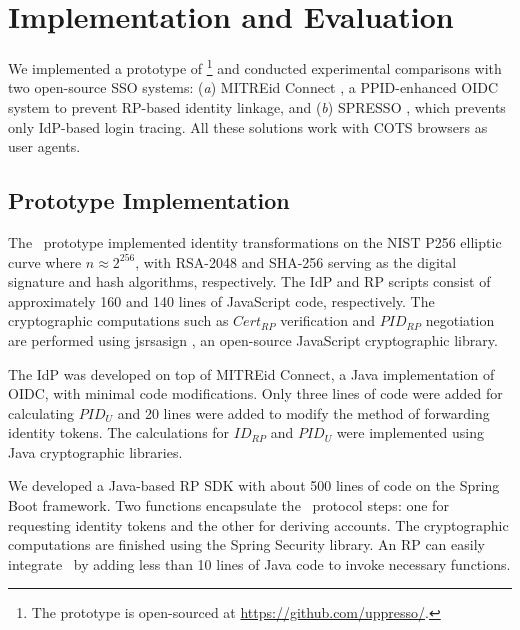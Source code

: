 \section{Implementation and Evaluation}
\label{sec:implementation}

We implemented a prototype of \usso\footnote{The prototype is open-sourced at \url{https://github.com/uppresso/}.} and conducted experimental comparisons with two open-source SSO systems:
 (\emph{a}) MITREid Connect \cite{MITREid}, a PPID-enhanced OIDC system \cite{NIST2017draft} to prevent RP-based identity linkage,
 and (\emph{b}) SPRESSO \cite{SPRESSO}, which prevents only IdP-based login tracing.
All these solutions work with COTS browsers as user agents.

\subsection{Prototype Implementation}
\label{subsec:proto-imple}

The \usso\ prototype implemented identity transformations on the NIST P256 elliptic curve where $n \approx 2^{256}$, with RSA-2048 and SHA-256 serving as the digital signature and hash algorithms, respectively. The IdP and RP scripts consist of approximately 160 and 140 lines of JavaScript code, respectively.  %
The cryptographic computations such as $Cert_{RP}$ verification and $PID_{RP}$ negotiation are performed using jsrsasign \cite{jsrsasign}, an open-source JavaScript cryptographic library.

The IdP was developed on top of MITREid Connect\cite{MITREid}, a Java implementation of OIDC, %
with minimal code modifications. Only three lines of code were added for calculating $PID_U$ and 20 lines were added to modify the method of forwarding identity tokens.
The calculations for $ID_{RP}$ and $PID_U$ were implemented using Java cryptographic libraries.

We developed a Java-based RP SDK with about 500 lines of code on the Spring Boot framework.
Two functions encapsulate the \usso\ protocol steps: one for requesting identity tokens and the other for deriving accounts. The cryptographic computations are finished using the Spring Security library.
An RP can easily integrate \usso\ by  adding less than 10 lines of Java code to invoke necessary functions.
